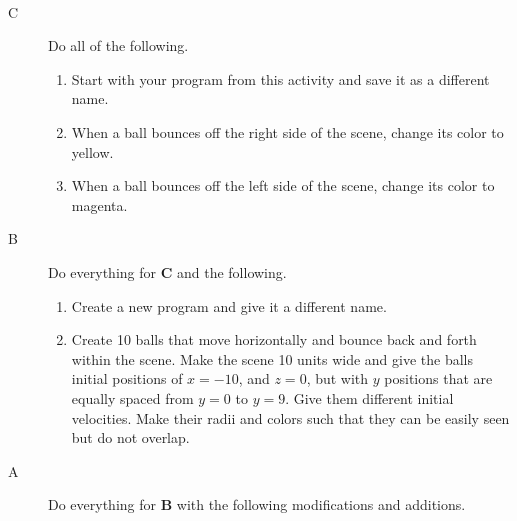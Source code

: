 \ \\

\newpage


\analysis

\begin{description}

\item[C] Do all of the following.
\begin{enumerate}
	\item Start with your program from this activity and save it as a different name.
	\item When a ball bounces off the right side of the scene, change its color to yellow. 
	\item When a ball bounces off the left side of the scene, change its color to magenta.
\end{enumerate}

\item[B] Do everything for {\bf C} and the following.

\begin{enumerate}
	\item Create a new program and give it a different name.
	\item Create 10 balls that move horizontally and bounce back and forth within the scene. Make the scene 10 units wide and give the balls initial positions of $x=-10$, and $z=0$, but with $y$ positions that are equally spaced from $y=0$ to $y=9$. Give them different initial velocities. Make their radii and colors such that they can be easily seen but do not overlap.
\end{enumerate}

\item[A] Do everything for {\bf B} with the following modifications and additions.


\end{description}
